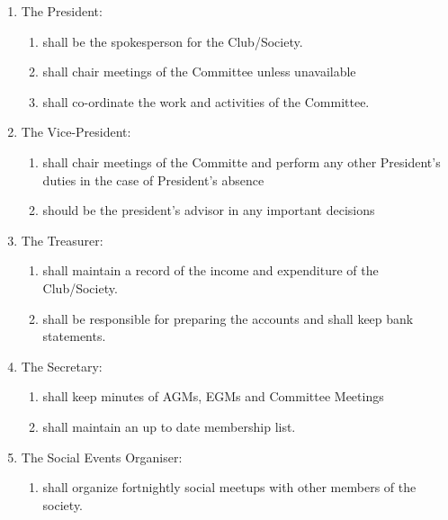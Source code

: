 \documentclass{report}
\begin{document}
	\begin{enumerate}
		\item{The President:
			\begin{enumerate}
				\item{shall be the spokesperson for the Club/Society.}
				\item{shall chair meetings of the Committee unless unavailable }
				\item{shall co-ordinate the work and activities of the Committee.}
			\end{enumerate}
		}
		\item{The Vice-President:
			\begin{enumerate}
				\item{shall chair meetings of the Committe and perform any other President’s duties in the case of President's absence}
				\item{should be the president's advisor in any important decisions}
			\end{enumerate}
		}
		\item{The Treasurer:
			\begin{enumerate}
				\item{shall maintain a record of the income and expenditure of the Club/Society.}
				\item{shall be responsible for preparing the accounts and shall keep bank statements.}
			\end{enumerate}
		}
		\item{The Secretary:
			\begin{enumerate}
				\item{shall keep minutes of AGMs, EGMs and Committee Meetings}
				\item{shall maintain an up to date membership list.}
			\end{enumerate}
		}
		\item{The Social Events Organiser:
			\begin{enumerate}
				\item{shall organize fortnightly social meetups with other members of the society.}
			\end{enumerate}
		}


\end{enumerate}
\end{document}
